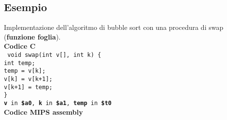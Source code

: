 \documentclass[../main.tex]{subfiles}
\begin{document}
\subsection*{Esempio}
Implementazione dell'algoritmo di bubble sort con una procedura di swap
(\textbf{funzione foglia}).
\\[5mm]
\textbf{Codice C} \\
\texttt{
    void swap(int v[], int k) \{ \\
    \hspace*{0cm} \hspace*{0cm} \hspace*{0cm} \hspace*{0cm} int temp; \\
    \hspace*{0cm} \hspace*{0cm} \hspace*{0cm} \hspace*{0cm} temp = v[k]; \\
    \hspace*{0cm} \hspace*{0cm} \hspace*{0cm} \hspace*{0cm} v[k] = v[k+1]; \\
    \hspace*{0cm} \hspace*{0cm} \hspace*{0cm} \hspace*{0cm} v[k+1] = temp; \\
    \} \\[1mm]
}
\texttt{\textbf{v} in \textbf{\$a0}, \textbf{k} in \textbf{\$a1}, \textbf{temp} in \textbf{\$t0}}
\\[5mm]
\textbf{Codice MIPS assembly} \\[2mm]
\end{document}

